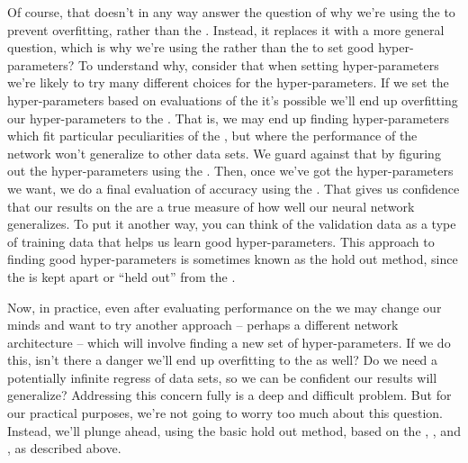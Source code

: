 \documentclass[a4paper,twoside,10pt]{book}
\begin{document}
Of course, that doesn't in any way answer the question of why we're using the  to prevent overfitting, rather than the . Instead, it replaces it with a more general question, which is why we're using the  rather than the  to set good hyper-parameters? To understand why, consider that when setting hyper-parameters we're likely to try many different choices for the hyper-parameters. If we set the hyper-parameters based on evaluations of the  it's possible we'll end up overfitting our hyper-parameters to the . That is, we may end up finding hyper-parameters which fit particular peculiarities of the , but where the performance of the network won't generalize to other data sets. We guard against that by figuring out the hyper-parameters using the . Then, once we've got the hyper-parameters we want, we do a final evaluation of accuracy using the . That gives us confidence that our results on the  are a true measure of how well our neural network generalizes. To put it another way, you can think of the validation data as a type of training data that helps us learn good hyper-parameters. This approach to finding good hyper-parameters is sometimes known as the hold out method, since the  is kept apart or ``held out'' from the .

Now, in practice, even after evaluating performance on the  we may change our minds and want to try another approach -- perhaps a different network architecture -- which will involve finding a new set of hyper-parameters. If we do this, isn't there a danger we'll end up overfitting to the  as well? Do we need a potentially infinite regress of data sets, so we can be confident our results will generalize? Addressing this concern fully is a deep and difficult problem. But for our practical purposes, we're not going to worry too much about this question. Instead, we'll plunge ahead, using the basic hold out method, based on the , , and , as described above.
\end{document}
